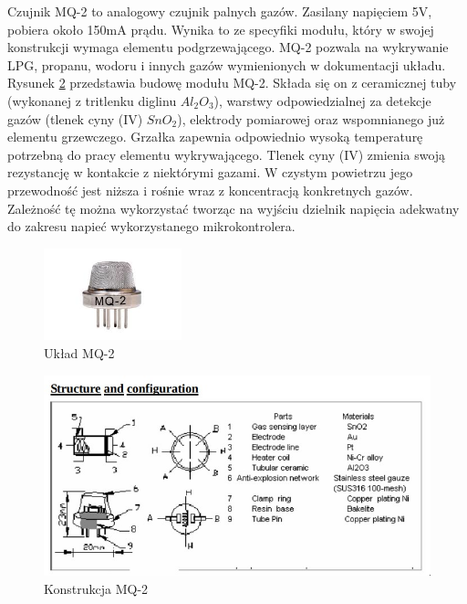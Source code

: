 Czujnik MQ-2 to analogowy czujnik palnych gazów. Zasilany napięciem 5V, pobiera około 150mA prądu. Wynika to ze specyfiki modułu, który w swojej konstrukcji wymaga elementu podgrzewającego. MQ-2 pozwala na wykrywanie LPG, propanu, wodoru i innych gazów wymienionych w dokumentacji układu\cite{mq2_datasheet}.
\newline
Rysunek \ref{img:mq_elements} przedstawia budowę modułu MQ-2. Składa się on z ceramicznej tuby (wykonanej z tritlenku diglinu $Al_2O_3$), warstwy odpowiedzialnej za detekcje gazów (tlenek cyny (IV) $SnO_2$), elektrody pomiarowej oraz wspomnianego już elementu grzewczego. Grzałka zapewnia odpowiednio wysoką temperaturę potrzebną do pracy elementu wykrywającego. Tlenek cyny (IV) zmienia swoją rezystancję w kontakcie z niektórymi gazami. W czystym powietrzu jego przewodność jest niższa i rośnie wraz z koncentracją konkretnych gazów. Zależność tę można wykorzystać tworząc na wyjściu dzielnik napięcia adekwatny do zakresu napieć wykorzystanego mikrokontrolera.
\begin{figure}[H]
    \centering
    \includegraphics[width=4cm]{Graphics/mq2_img.png}
    \caption{Układ MQ-2\cite{bmp_mouser}}
    \label{img:mq_img}
\end{figure}

\begin{figure}[H]
    \centering
    \includegraphics[width=\textwidth, height=\textheight, keepaspectratio]{Graphics/mq_elements.jpg}
    \caption{Konstrukcja MQ-2\cite{mq2_datasheet}}
    \label{img:mq_elements}
\end{figure}

